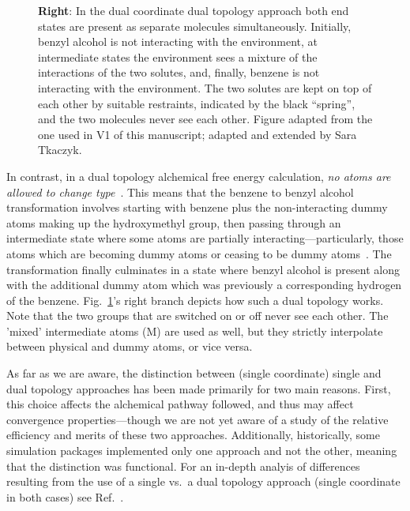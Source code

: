 \documentclass[9pt,bestpractices]{livecoms}
\newcommand{\sbnote}[1]{%
  {\bfseries{}[SB: }%
  {\textcolor{blue}{#1}}{\bfseries{}]}
  }
\begin{document}
\begin{figure}
{      %
\textbf{Right}: In the dual coordinate dual topology approach both end states are present as separate molecules simultaneously.  Initially, benzyl alcohol is not interacting with the environment, at intermediate states the environment sees a mixture of the interactions of the two solutes, and, finally, benzene is not interacting with the environment. The two solutes are kept on top of each other by suitable restraints, indicated by the black ``spring'', and  the two molecules never see each other.  Figure adapted from the one used in V1 of this manuscript; adapted and extended by Sara Tkaczyk.
    }
    \label{fig:fig_topology}
\end{figure} 

In contrast, in a dual topology alchemical free energy calculation, \emph{no atoms are allowed to change type}~\cite{boresch1999role, shirts2012best}. This means that the benzene to benzyl alcohol transformation involves starting with benzene plus the non-interacting dummy atoms making up the hydroxymethyl group, then passing through an intermediate state where some atoms are partially interacting---particularly, those atoms which are becoming dummy atoms or ceasing to be dummy atoms~\cite{mobley2014blind}. The transformation finally culminates in a state where benzyl alcohol is present along with the additional dummy atom which was previously a corresponding hydrogen of the benzene. Fig.~\ref{fig:fig_topology}'s right branch depicts how such a dual topology works. Note that the two groups that are switched on or off never see each other. The 'mixed' intermediate atoms (M) are used as well, but they strictly interpolate between physical and dummy atoms, or vice versa.


As far as we are aware, the distinction between (single coordinate) single and dual topology approaches has been made primarily for two main reasons. First, this choice affects the alchemical pathway followed, and thus may affect convergence properties---though we are not yet aware of a study of the relative efficiency and merits of these two approaches. Additionally, historically, some simulation packages implemented only one approach and not the other, meaning that the distinction was functional. For an in-depth analyis of differences resulting from the use of a  single vs.\ a dual topology approach (single coordinate in both cases) see Ref.~\cite{Boresch_2002}.
\end{document}
